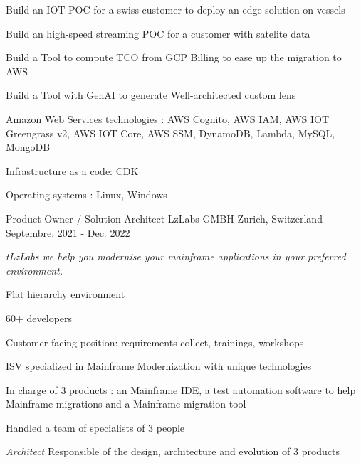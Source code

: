 \begin{cventries}
{{            }
            {
                \begin{cvitems} %
                    \item {Build an IOT POC for a swiss customer to deploy an edge solution on vessels}
                    \item {Build an high-speed streaming POC for a customer with satelite data}    
                    \item {Build a Tool to compute TCO from GCP Billing to ease up the migration to AWS}
                    \item {Build a Tool with GenAI to generate Well-architected custom lens}
                    \item{Amazon Web Services technologies : AWS Cognito, AWS IAM, AWS IOT Greengrass v2, AWS IOT Core, AWS SSM, DynamoDB, Lambda, MySQL, MongoDB}
		            \item{Infrastructure as a code: CDK}
		            \item{Operating systems : Linux, Windows}
                \end{cvitems}
            }            
    }%
    \cventry
    {Product Owner / Solution Architect} %
    {LzLabs GMBH} %
    {Zurich, Switzerland} %
    {Septembre. 2021 - Dec. 2022} %
    {
        \experience
            {
                \begin{cvitems} %
                    \item{\emph{tLzLabs we help you modernise your mainframe applications in your preferred environment.}}
                    \item{Flat hierarchy environment}
                    \item{60+ developers}
                    \item{Customer facing position: requirements collect, trainings, workshops }
                    \item{ISV specialized in Mainframe Modernization with unique technologies}
                    \item{In charge of 3 products : an Mainframe IDE, a test automation software to help Mainframe migrations and a Mainframe migration tool }
                    \item{Handled a team of specialists of 3 people}
                    \item {\emph{Architect} Responsible of the design, architecture and evolution of 3 products }

\end{cvitems}}}
\end{cventries}
